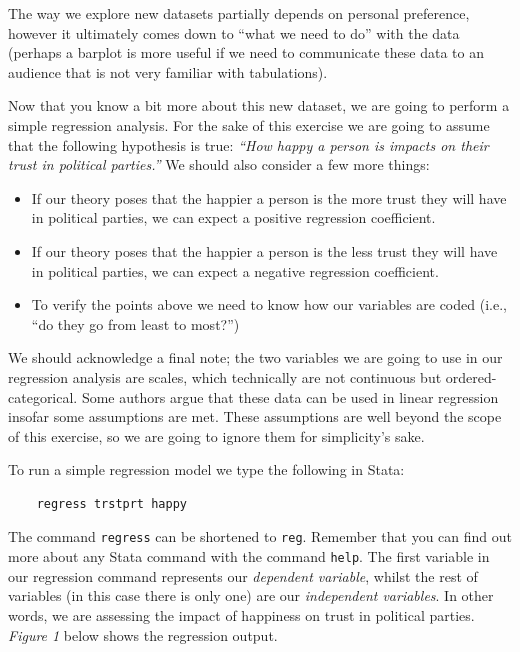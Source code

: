\documentclass{article}
\begin{document}
The way we explore new datasets partially depends on personal preference, however it ultimately comes down to ``what we need to do'' with the data (perhaps a barplot is more useful if we need to communicate these data to an audience that is not very familiar with tabulations).

Now that you know a bit more about this new dataset, we are going to perform a simple regression analysis. For the sake of this exercise we are going to assume that the following hypothesis is true: \textit{``How happy a person is impacts on their trust in political parties.''} We should also consider a few more things:

\begin{itemize}
	\item If our theory poses that the happier a person is the more trust they will have in political parties, we can expect a positive regression coefficient.
	\item If our theory poses that the happier a person is the less trust they will have in political parties, we can expect a negative regression coefficient.
	\item To verify the points above we need to know how our variables are coded (i.e., ``do they go from least to most?'')
\end{itemize}

We should acknowledge a final note; the two variables we are going to use in our regression analysis are scales, which technically are not continuous but ordered-categorical. Some authors argue that these data can be used in linear regression insofar some assumptions are met. These assumptions are well beyond the scope of this exercise, so we are going to ignore them for simplicity's sake.

To run a simple regression model we type the following in Stata:

\begin{lstlisting}
	regress trstprt happy
\end{lstlisting}

The command \texttt{regress} can be shortened to \texttt{reg}. Remember that you can find out more about any Stata command with the command \texttt{help}. The first variable in our regression command represents our \textit{dependent variable}, whilst the rest of variables (in this case there is only one) are our \textit{independent variables}. In other words, we are assessing the impact of happiness on trust in political parties. \textit{Figure 1} below shows the regression output.
\end{document}
